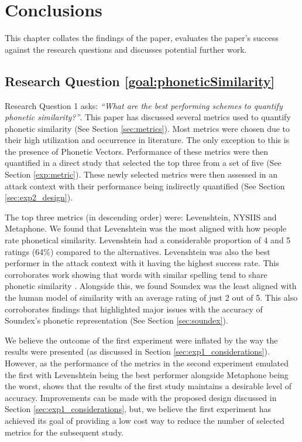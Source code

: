 \chapter{Conclusions}
This chapter collates the findings of the paper, evaluates the paper's success against the research questions and discusses potential further work.

\section{Research Question \ref{goal:phoneticSimilarity}}

Research Question 1 asks: \textit{“What are the best performing schemes to quantify phonetic similarity?”}. This paper has discussed several metrics used to quantify phonetic similarity (See Section \ref{sec:metrics}). Most metrics were chosen due to their high utilization and occurrence in literature. The only exception to this is the presence of Phonetic Vectors. Performance of these metrics were then quantified in a direct study that selected the top three from a set of five (See Section \ref{exp:metric}). These newly selected metrics were then assessed in an attack context with their performance being indirectly quantified (See Section \ref{sec:exp2_design}).

The top three metrics (in descending order) were: Levenshtein, NYSIIS and Metaphone. We found that Levenshtein was the most aligned with how people rate phonetical similarity. Levenshtein had a considerable proportion of 4 and 5 ratings (64\%) compared to the alternatives. Levenshtein was also the best performer in the attack context with it having the highest success rate. This corroborates work showing that words with similar spelling tend to share phonetic similarity \cite{hettiarachchi2012sparcl}.
Alongside this, we found Soundex was the least aligned with the human model of similarity with an average rating of just 2 out of 5. This also corroborates findings that highlighted major issues with the accuracy of Soundex’s phonetic representation (See Section \ref{sec:soundex}).

We believe the outcome of the first experiment were inflated by the way the results were presented (as discussed in Section \ref{sec:exp1_considerations}). However, as the performance of the metrics in the second experiment emulated the first with Levenshtein being the best performer alongside Metaphone being the worst, shows that the results of the first study maintains a desirable level of accuracy. Improvements can be made with the proposed design discussed in Section \ref{sec:exp1_considerations}, but, we believe the first experiment has achieved its goal of providing a low cost way to reduce the number of selected metrics for the subsequent study.

